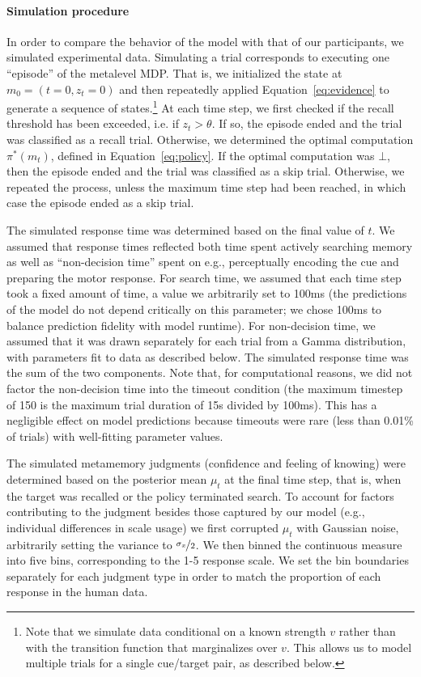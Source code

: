 \paragraph{Simulation procedure}
In order to compare the behavior of the model with that of our participants, we simulated experimental data. Simulating a trial corresponds to executing one ``episode'' of the metalevel MDP. That is, we initialized the state at $m_0 = (t=0, z_t = 0)$ and then repeatedly applied Equation~\ref{eq:evidence} to generate a sequence of states.\footnote{Note that we simulate data conditional on a known strength $v$ rather than with the transition function that marginalizes over $v$. This allows us to model multiple trials for a single cue/target pair, as described below.} At each time step, we first checked if the recall threshold has been exceeded, i.e. if $z_t > \theta$. If so, the episode ended and the trial was classified as a recall trial. Otherwise, we determined the optimal computation $\pi^*(m_t)$, defined in Equation~\ref{eq:policy}. If the optimal computation was $\bot$, then the episode ended and the trial was classified as a skip trial. Otherwise, we repeated the process, unless the maximum time step had been reached, in which case the episode ended as a skip trial.

The simulated response time was determined based on the final value of $t$. We assumed that response times reflected both time spent actively searching memory as well as ``non-decision time'' spent on e.g., perceptually encoding the cue and preparing the motor response. For search time, we assumed that each time step took a fixed amount of time, a value we arbitrarily set to 100ms (the predictions of the model do not depend critically on this parameter; we chose 100ms to balance prediction fidelity with model runtime). For non-decision time, we assumed that it was drawn separately for each trial from a Gamma distribution, with parameters fit to data as described below. The simulated response time was the sum of the two components. Note that, for computational reasons, we did not factor the non-decision time into the timeout condition (the maximum timestep of 150 is the maximum trial duration of 15s divided by 100ms). This has a negligible effect on model predictions because timeouts were rare (less than 0.01\% of trials) with well-fitting parameter values.

The simulated metamemory judgments (confidence and feeling of knowing) were determined based on the posterior mean $\mu_t$ at the final time step, that is, when the target was recalled or the policy terminated search. To account for factors contributing to the judgment besides those captured by our model (e.g., individual differences in scale usage) we first corrupted $\mu_t$ with Gaussian noise, arbitrarily setting the variance to $\nicefrac{\sigma_x}{2}$. We then binned the continuous measure into five bins, corresponding to the 1-5 response scale. We set the bin boundaries separately for each judgment type in order to match the proportion of each response in the human data.

